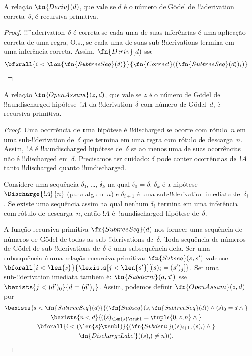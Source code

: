\documentclass[../../../include/open-logic-section]{subfiles}
\begin{document}
\begin{prop}
  A relação $\fn{Deriv}(d)$, que vale se $d$ é o número de G\"odel de
  !!a{derivation} correta~$\delta$, é recursiva primitiva.
\end{prop}

\begin{proof}
  !!^a{derivation}~$\delta$ é correta se cada uma de suas inferências
  é uma aplicação correta de uma regra, O.s.\@, se cada uma de suas
  sub-!!{derivation}s termina em uma inferência correta. Assim,
  $\fn{Deriv}(d)$ sse
  \[
  \bforall{i<\len{\fn{SubtreeSeq}(d)}}{\fn{Correct}((\fn{SubtreeSeq}(d))_i)}
  \]
\end{proof}

\begin{prop}
   A relação $\fn{OpenAssum}(z, d)$, que vale
  se $z$ é o número de G\"odel de !!a{undischarged} hipótese~$!A$ da
  !!{derivation}~$\delta$ com número de G\"odel~$d$, é recursiva
  primitiva.
\end{prop}

\begin{proof}
  Uma ocorrência de uma hipótese é !!{discharged} se ocorre com
  rótulo~$n$ em uma sub-!!{derivation} de~$\delta$ que termina em uma
  regra com rótulo de descarga~$n$. Assim, $!A$ é !!a{undischarged}
  hipótese de~$\delta$ se ao menos uma de suas ocorrências não é
  !!{discharged} em~$\delta$. Precisamos ter cuidado: $\delta$ pode
  conter ocorrências de~$!A$ tanto !!{discharged} quanto
  !!{undischarged}.

  Considere uma sequência $\delta_0$, \dots, $\delta_k$ na qual
  $\delta_0 = \delta$, $\delta_k$ é a hipótese $\Discharge{!A}{n}$
  (para algum~$n$) e $\delta_{i+1}$ é uma sub-!!{derivation} imediata
  de~$\delta_i$. Se existe uma sequência assim na qual nenhum
  $\delta_i$ termina em uma inferência com rótulo de descarga~$n$,
  então $!A$ é !!a{undischarged} hipótese de~$\delta$.

  A função recursiva primitiva $\fn{SubtreeSeq}(d)$ nos fornece uma
  sequência de números de G\"odel de todas as sub-!!{derivation}s
  de~$\delta$. Toda sequência de números de G\"odel de
  sub-!!{derivation}s de~$\delta$ é uma subsequência dela. Ser uma
  subsequência é uma relação recursiva primitiva:
  $\fn{Subseq}(s, s')$ vale sse
  $\bforall{i<\len{s}}{\lexists[j<\len{s'}][(s)_i = (s')_j]}$. Ser uma
  sub-!!{derivation} imediata também é: $\fn{Subderiv}(d, d')$ sse
  $\bexists{j<(d')_0}{d = (d')_j}$. Assim, podemos definir
  $\fn{OpenAssum}(z, d)$ por
  \begin{multline*}
    \bexists{s<\fn{SubtreeSeq}(d)}{(\fn{Subseq}(s, \fn{SubtreeSeq}(d))
      \land (s)_0 = d \land {}} \\
    \bexists{n<d}{((s)_{\len{s} \tsub 1} = \tuple{0, z, n} \land {}}\\
      \bforall{i<(\len{s} \tsub 1)}{(\fn{Subderiv}((s)_{i+1}, (s)_i) \land {}}\\
      \fn{DischargeLabel}((s)_i) \neq n))).
  \end{multline*}
\end{proof}
\end{document}
